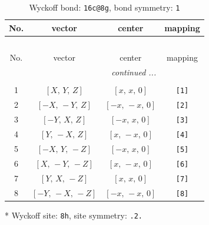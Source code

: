 \documentclass[fleqn,8pt]{jsarticle}
\begin{document}
\renewcommand{\arraystretch}{1.2}
\begin{longtable}{cccc}
\caption{Wyckoff bond: {\tt 16c@8g}, bond symmetry: {\tt 1}}
 \\
 \hline \hline
No. & vector & center & mapping \\ \hline \endfirsthead

\multicolumn{3}{l}{\tablename\ \thetable{}} \\
 \hline \hline
No. & vector & center & mapping \\ \hline \endhead

 \hline \hline
\multicolumn{3}{r}{\footnotesize\it continued ...} \\ \endfoot

 \hline \hline
\multicolumn{3}{r}{} \\ \endlastfoot

1 & $\left[ X,\, Y,\, Z \right]$ & $\left[ x,\, x,\, 0 \right]$ & {\tt [1]} \\ \hline
2 & $\left[ - X,\, - Y,\, Z \right]$ & $\left[ - x,\, - x,\, 0 \right]$ & {\tt [2]} \\ \hline
3 & $\left[ - Y,\, X,\, Z \right]$ & $\left[ - x,\, x,\, 0 \right]$ & {\tt [3]} \\ \hline
4 & $\left[ Y,\, - X,\, Z \right]$ & $\left[ x,\, - x,\, 0 \right]$ & {\tt [4]} \\ \hline
5 & $\left[ - X,\, Y,\, - Z \right]$ & $\left[ - x,\, x,\, 0 \right]$ & {\tt [5]} \\ \hline
6 & $\left[ X,\, - Y,\, - Z \right]$ & $\left[ x,\, - x,\, 0 \right]$ & {\tt [6]} \\ \hline
7 & $\left[ Y,\, X,\, - Z \right]$ & $\left[ x,\, x,\, 0 \right]$ & {\tt [7]} \\ \hline
8 & $\left[ - Y,\, - X,\, - Z \right]$ & $\left[ - x,\, - x,\, 0 \right]$ & {\tt [8]} \\
\end{longtable}
* Wyckoff site: {\tt 8h}, site symmetry: {\tt .2.}
\renewcommand{\arraystretch}{1.2}
\end{document}
